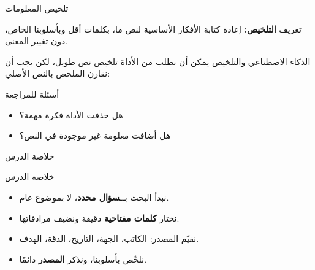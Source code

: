 \documentclass[aspectratio=169, 11pt, xcolor={table}]{beamer}
\begin{document}
\begin{frame}{تلخيص المعلومات}
    \begin{tbox}{\faLightbulb\quad تعريف}
        \textbf{التلخيص:} إعادة كتابة الأفكار الأساسية لنص ما،
        بكلمات أقل وبأسلوبنا الخاص، دون تغيير المعنى.
    \end{tbox}
    \begin{center}
    \end{center}
\end{frame}

\begin{frame}{الذكاء الاصطناعي والتلخيص}
    يمكن أن نطلب من الأداة تلخيص نص طويل،
    لكن يجب أن نقارن الملخص بالنص الأصلي:
    \begin{obox}{\faExclamationTriangle\quad أسئلة للمراجعة}
        \begin{itemize}
            \item هل حذفت الأداة فكرة مهمة؟
            \item هل أضافت معلومة غير موجودة في النص؟
        \end{itemize}
    \end{obox}
\end{frame}

\begin{frame}{خلاصة الدرس}
    \begin{tbox}{\faCheckCircle\quad خلاصة الدرس}
        \begin{itemize}
            \item نبدأ البحث بــ\textbf{سؤال محدد}، لا بموضوع عام.
            \item نختار \textbf{كلمات مفتاحية} دقيقة ونضيف مرادفاتها.
            \item نقيّم المصدر: الكاتب، الجهة، التاريخ، الدقة، الهدف.
            \item نلخّص بأسلوبنا، ونذكر \textbf{المصدر} دائمًا.
        \end{itemize}
    \end{tbox}
\end{frame}
\end{document}
